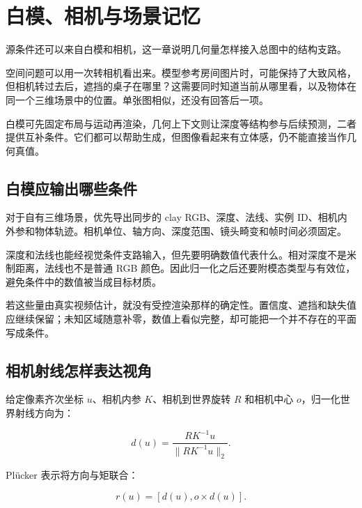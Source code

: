 \chapter{白模、相机与场景记忆}\label{seedance-m18}

源条件还可以来自白模和相机，这一章说明几何量怎样接入总图中的结构支路。

空间问题可以用一次转相机看出来。模型参考房间图片时，可能保持了大致风格，但相机转过去后，遮挡的桌子在哪里？这需要同时知道当前从哪里看，以及物体在同一个三维场景中的位置。单张图相似，还没有回答后一项。

白模可先固定布局与运动再渲染，几何上下文则让深度等结构参与后续预测，二者提供互补条件。它们都可以帮助生成，但图像看起来有立体感，仍不能直接当作几何真值。

\section{白模应输出哪些条件}\label{seedance-m18-ux767dux6a21ux5e94ux8f93ux51faux54eaux4e9bux6761ux4ef6}

对于自有三维场景，优先导出同步的 clay RGB、深度、法线、实例 ID、相机内外参和物体轨迹。相机单位、轴方向、深度范围、镜头畸变和帧时间必须固定。

深度和法线也能经视觉条件支路输入，但先要明确数值代表什么。相对深度不是米制距离，法线也不是普通 RGB 颜色。因此归一化之后还要附模态类型与有效位，避免条件中的数值被当成目标材质。

若这些量由真实视频估计，就没有受控渲染那样的确定性。置信度、遮挡和缺失值应继续保留；未知区域随意补零，数值上看似完整，却可能把一个并不存在的平面写成条件。

\section{相机射线怎样表达视角}\label{seedance-m18-ux76f8ux673aux5c04ux7ebfux600eux6837ux8868ux8fbeux89c6ux89d2}

给定像素齐次坐标 \(u\)、相机内参 \(K\)、相机到世界旋转 \(R\) 和相机中心 \(o\)，归一化世界射线方向为：

\[
d(u)=\frac{RK^{-1}u}{\lVert RK^{-1}u\rVert_2}.
\]

Plücker 表示将方向与矩联合：

\[
r(u)=[d(u),o\times d(u)].
\]

